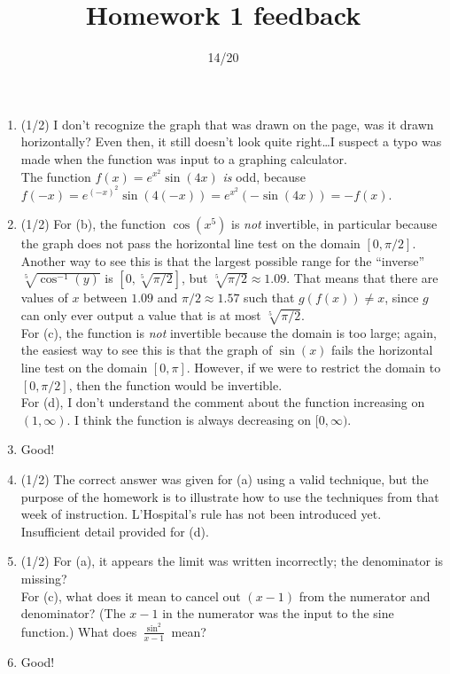 \documentclass{article}
\title{Homework 1 feedback}
\author{14/20}
\date{}
\begin{document}
\maketitle
\begin{enumerate}
	\item (1/2) I don't recognize the graph that was drawn on the page, was it drawn horizontally? Even then, it still doesn't look quite right\ldots I suspect a typo was made when the function was input to a graphing calculator.\\
		The function $f(x) = e^{x^{2}} \sin(4x)$ \emph{is} odd, because $f(-x) = e^{(-x)^{2}} \sin(4(-x)) = e^{x^{2}} (- \sin(4x)) = - f(x)$.
	\item (1/2) For (b), the function $\cos(x^{5})$ is \emph{not} invertible, in particular because the graph does not pass the horizontal line test on the domain $[0, \pi/2]$. Another way to see this is that the largest possible range for the ``inverse'' $\sqrt[5]{\cos^{-1}(y)}$ is $[0, \sqrt[5]{\pi/2}]$, but $\sqrt[5]{\pi/2} \approx 1.09$. That means that there are values of $x$ between $1.09$ and $\pi/2 \approx 1.57$ such that $g(f(x)) \neq x$, since $g$ can only ever output a value that is at most $\sqrt[5]{\pi/2}$.\\
		For (c), the function is \emph{not} invertible because the domain is too large; again, the easiest way to see this is that the graph of $\sin(x)$ fails the horizontal line test on the domain $[0, \pi]$. However, if we were to restrict the domain to $[0, \pi/2]$, then the function would be invertible.\\
		For (d), I don't understand the comment about the function increasing on $(1, \infty)$. I think the function is always decreasing on $[0, \infty)$.
	\item Good!
	\item (1/2) The correct answer was given for (a) using a valid technique, but the purpose of the homework is to illustrate how to use the techniques from that week of instruction. L'Hospital's rule has not been introduced yet.\\
		Insufficient detail provided for (d). 
	\item (1/2) For (a), it appears the limit was written incorrectly; the denominator is missing?\\
		For (c), what does it mean to cancel out $(x-1)$ from the numerator and denominator? (The $x-1$ in the numerator was the input to the sine function.) What does $\frac{\sin^{2}}{x-1}$ mean?
	\item Good!

\end{enumerate}
\end{document}
